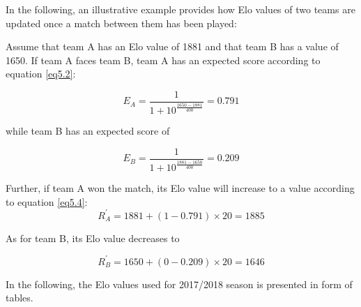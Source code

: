 \newpar

In the following, an illustrative example provides how Elo values of two teams are updated once a match between them has been played:

\newpar

Assume that team A has an Elo value of 1881 and that team B has a value of 1650. If team A faces team B, team A has an expected score according to equation \ref{eq5.2}:

\begin{equation*}
    E_A = \frac{1}{1+10^{\frac{1650-1881}{400}}} = 0.791
\end{equation*}

while team B has an expected score of

\begin{equation*}
    E_B = \frac{1}{1+10^{\frac{1881-1650}{400}}} = 0.209
\end{equation*}

Further, if team A won the match, its Elo value will increase to a value according to equation \ref{eq5.4}: 
\begin{equation*}
   R^{'}_A= 1881 + (1-0.791) \times 20 = 1885
\end{equation*}

As for team B, its Elo value decreases to

\begin{equation*}
   R^{'}_B = 1650 + (0-0.209) \times 20 = 1646 
\end{equation*}

In the following, the Elo values used for 2017/2018 season is presented in form of tables.

